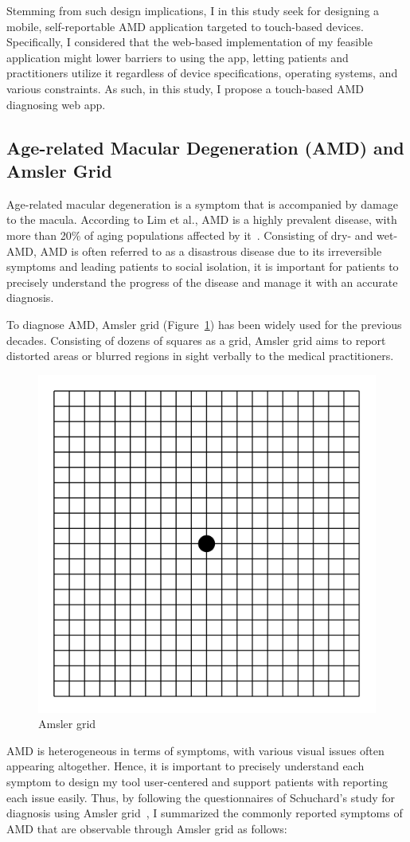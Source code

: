 Stemming from such design implications, I in this study seek for designing a mobile, self-reportable AMD application targeted to touch-based devices. Specifically, I considered that the web-based implementation of my feasible application might lower barriers to using the app, letting patients and practitioners utilize it regardless of device specifications, operating systems, and various constraints. As such, in this study, I propose a touch-based AMD diagnosing web app.

\subsection{Age-related Macular Degeneration (AMD) and Amsler Grid}

Age-related macular degeneration is a symptom that is accompanied by damage to the macula. According to Lim et al., AMD is a highly prevalent disease, with more than 20\% of aging populations affected by it~\cite{lim2012age}. Consisting of dry- and wet-AMD, AMD is often referred to as a disastrous disease due to its irreversible symptoms and leading patients to social isolation, it is important for patients to precisely understand the progress of the disease and manage it with an accurate diagnosis.

To diagnose AMD, Amsler grid (Figure~\ref{fig:amsler_grid}) has been widely used for the previous decades. Consisting of dozens of squares as a grid, Amsler grid aims to report distorted areas or blurred regions in sight verbally to the medical practitioners.

\begin{figure}[h!]
    \centering
    \includegraphics[width=0.5\linewidth]{figure/amsler_grid.png}
    \caption{Amsler grid}
    \label{fig:amsler_grid}
\end{figure}

AMD is heterogeneous in terms of symptoms, with various visual issues often appearing altogether. Hence, it is important to precisely understand each symptom to design my tool user-centered and support patients with reporting each issue easily. Thus, by following the questionnaires of Schuchard's study for diagnosis using Amsler grid~\cite{schuchard1993validity}, I summarized the commonly reported symptoms of AMD that are observable through Amsler grid as follows:

